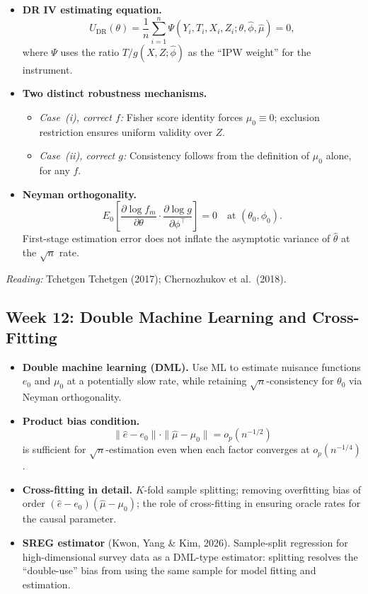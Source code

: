\documentclass[12pt]{article}
\begin{document}
\begin{itemize}
  \item \textbf{DR IV estimating equation.}
    \[
      U_{\mathrm{DR}}(\theta) = \frac{1}{n}\sum_{i=1}^n
        \Psi(Y_i, T_i, X_i, Z_i;\theta, \hat\phi, \hat\mu) = 0,
    \]
    where $\Psi$ uses the ratio $T/g(X,Z;\hat\phi)$ as the ``IPW
    weight'' for the instrument.

  \item \textbf{Two distinct robustness mechanisms.}
    \begin{itemize}
      \item \emph{Case~(i), correct $f$:} Fisher score identity forces
        $\mu_0 \equiv 0$; exclusion restriction ensures uniform validity
        over $Z$.
      \item \emph{Case~(ii), correct $g$:} Consistency follows from the
        definition of $\mu_0$ alone, for any $f$.
    \end{itemize}

  \item \textbf{Neyman orthogonality.}
    \[
      E_0\!\left[\frac{\partial \log f_m}{\partial\theta} \cdot
                \frac{\partial \log g}{\partial\phi^\top}\right] = 0
      \quad\text{at }(\theta_0,\phi_0).
    \]
    First-stage estimation error does not inflate the asymptotic
    variance of $\hat\theta$ at the $\sqrt{n}$ rate.
\end{itemize}

\noindent\textit{Reading:} Tchetgen Tchetgen (2017);
Chernozhukov et al.\ (2018).

\subsection{Week 12: Double Machine Learning and Cross-Fitting}

\begin{itemize}
  \item \textbf{Double machine learning (DML).}
    Use ML to estimate nuisance functions $e_0$ and $\mu_0$ at a
    potentially slow rate, while retaining $\sqrt{n}$-consistency for
    $\theta_0$ via Neyman orthogonality.

  \item \textbf{Product bias condition.}
    \[
      \|\hat e - e_0\| \cdot \|\hat\mu - \mu_0\| = o_p(n^{-1/2})
    \]
    is sufficient for $\sqrt{n}$-estimation even when each factor
    converges at $o_p(n^{-1/4})$.

  \item \textbf{Cross-fitting in detail.}
    $K$-fold sample splitting; removing overfitting bias of order
    $(\hat e - e_0)(\hat\mu - \mu_0)$; the role of cross-fitting in
    ensuring oracle rates for the causal parameter.

  \item \textbf{SREG estimator} (Kwon, Yang \& Kim, 2026).
    Sample-split regression for high-dimensional survey data as a
    DML-type estimator: splitting resolves the ``double-use'' bias
    from using the same sample for model fitting and estimation.
\end{itemize}
\end{document}
